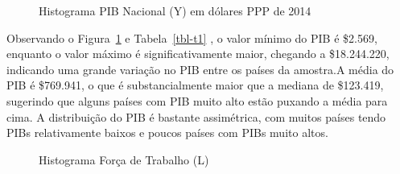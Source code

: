 \documentclass[
  letterpaper,
  DIV=11,
  numbers=noendperiod]{scrreprt}
\begin{document}
\begin{figure}

\caption{\label{fig-y}Histograma PIB Nacional (Y) em dólares PPP de
2014}


\end{figure}%

Observando o Figura~\ref{fig-y} e Tabela~\ref{tbl-t1} , o valor mínimo
do PIB é \$2.569, enquanto o valor máximo é significativamente maior,
chegando a \$18.244.220, indicando uma grande variação no PIB entre os
países da amostra.A média do PIB é \$769.941, o que é substancialmente
maior que a mediana de \$123.419, sugerindo que alguns países com PIB
muito alto estão puxando a média para cima. A distribuição do PIB é
bastante assimétrica, com muitos países tendo PIBs relativamente baixos
e poucos países com PIBs muito altos.

\begin{figure}

\caption{\label{fig-l}Histograma Força de Trabalho (L)}


\end{figure}%
\end{document}
